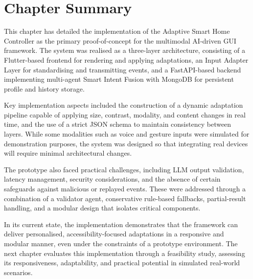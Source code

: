 \section{Chapter Summary}
This chapter has detailed the implementation of the Adaptive Smart Home Controller as the primary proof-of-concept for the multimodal AI-driven GUI framework. The system was realised as a three-layer architecture, consisting of a Flutter-based frontend for rendering and applying adaptations, an Input Adapter Layer for standardising and transmitting events, and a FastAPI-based backend implementing multi-agent Smart Intent Fusion with MongoDB for persistent profile and history storage.

Key implementation aspects included the construction of a dynamic adaptation pipeline capable of applying size, contrast, modality, and content changes in real time, and the use of a strict JSON schema to maintain consistency between layers. While some modalities such as voice and gesture inputs were simulated for demonstration purposes, the system was designed so that integrating real devices will require minimal architectural changes.

The prototype also faced practical challenges, including LLM output validation, latency management, security considerations, and the absence of certain safeguards against malicious or replayed events. These were addressed through a combination of a validator agent, conservative rule-based fallbacks, partial-result handling, and a modular design that isolates critical components.

In its current state, the implementation demonstrates that the framework can deliver personalised, accessibility-focused adaptations in a responsive and modular manner, even under the constraints of a prototype environment. The next chapter evaluates this implementation through a feasibility study, assessing its responsiveness, adaptability, and practical potential in simulated real-world scenarios.
